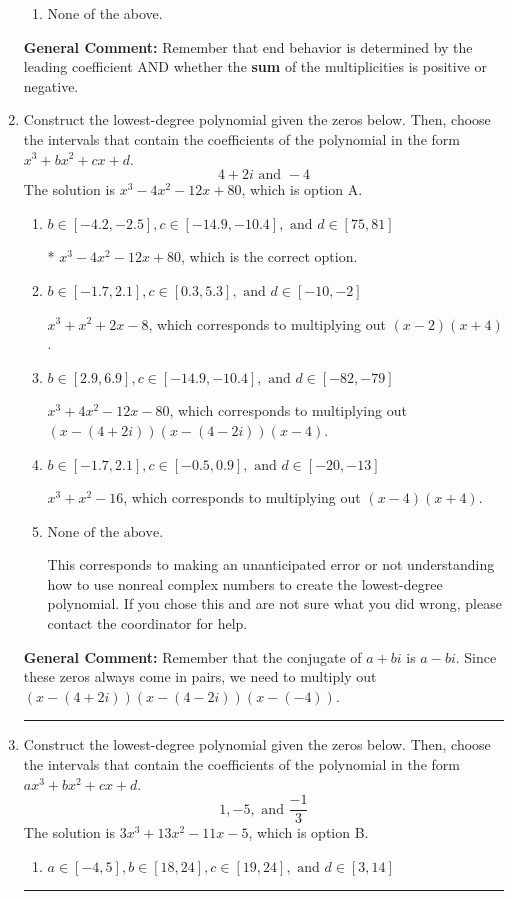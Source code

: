 \documentclass{extbook}[14pt]
\newcommand{\litem}[1]{\item #1

\rule{\textwidth}{0.4pt}}
\begin{document}
\begin{enumerate}
{\begin{enumerate}[label=\Alph*.]
\begin{multicols}{2}
\end{multicols}\item None of the above.\end{enumerate}
\textbf{General Comment:} Remember that end behavior is determined by the leading coefficient AND whether the \textbf{sum} of the multiplicities is positive or negative.
}
\litem{
Construct the lowest-degree polynomial given the zeros below. Then, choose the intervals that contain the coefficients of the polynomial in the form $x^3+bx^2+cx+d$.
\[ 4 + 2 i \text{ and } -4 \]The solution is \( x^{3} -4 x^{2} -12 x + 80 \), which is option A.\begin{enumerate}[label=\Alph*.]
\item \( b \in [-4.2, -2.5], c \in [-14.9, -10.4], \text{ and } d \in [75, 81] \)

* $x^{3} -4 x^{2} -12 x + 80$, which is the correct option.
\item \( b \in [-1.7, 2.1], c \in [0.3, 5.3], \text{ and } d \in [-10, -2] \)

$x^{3} + x^{2} +2 x -8$, which corresponds to multiplying out $(x -2)(x + 4)$.
\item \( b \in [2.9, 6.9], c \in [-14.9, -10.4], \text{ and } d \in [-82, -79] \)

$x^{3} +4 x^{2} -12 x -80$, which corresponds to multiplying out $(x-(4 + 2 i))(x-(4 - 2 i))(x -4)$.
\item \( b \in [-1.7, 2.1], c \in [-0.5, 0.9], \text{ and } d \in [-20, -13] \)

$x^{3} + x^{2} -16$, which corresponds to multiplying out $(x -4)(x + 4)$.
\item \( \text{None of the above.} \)

This corresponds to making an unanticipated error or not understanding how to use nonreal complex numbers to create the lowest-degree polynomial. If you chose this and are not sure what you did wrong, please contact the coordinator for help.
\end{enumerate}

\textbf{General Comment:} Remember that the conjugate of $a+bi$ is $a-bi$. Since these zeros always come in pairs, we need to multiply out $(x-(4 + 2 i))(x-(4 - 2 i))(x-(-4))$.
}
\litem{
Construct the lowest-degree polynomial given the zeros below. Then, choose the intervals that contain the coefficients of the polynomial in the form $ax^3+bx^2+cx+d$.
\[ 1, -5, \text{ and } \frac{-1}{3} \]The solution is \( 3x^{3} +13 x^{2} -11 x -5 \), which is option B.\begin{enumerate}[label=\Alph*.]
\item \( a \in [-4, 5], b \in [18, 24], c \in [19, 24], \text{ and } d \in [3, 14] \)


\end{enumerate}}
\end{enumerate}
\end{document}
